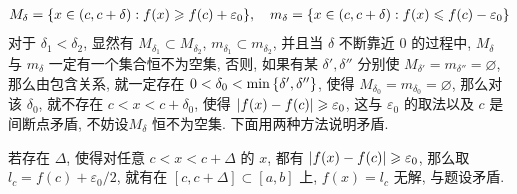 \begin{exercise}[series=exer]
\begin{answer}
        \begin{align*}
            M_{\delta} = \qty{x \in (c, c+\delta) : f(x) \geqslant f(c) + \varepsilon_{0}}, \quad m_{\delta} = \qty{x \in (c, c+\delta) : f(x) \leqslant f(c) - \varepsilon_{0}}
        \end{align*}
        对于 $ \delta_{1} < \delta_{2} $, 显然有 $ M_{\delta_{1}} \subset M_{\delta_{2}} $, $ m_{\delta_{1}} \subset m_{\delta_{2}} $, 并且当 $ \delta $ 不断靠近 $ 0 $ 的过程中, $ M_{\delta} $ 与 $ m_{\delta} $ 一定有一个集合恒不为空集, 否则, 如果有某 $ \delta', \delta'' $ 分别使 $ M_{\delta'} = m_{\delta''} = \varnothing $, 那么由包含关系, 就一定存在 $ 0 < \delta_{0} < \min\qty{\delta', \delta''} $, 使得 $ M_{\delta_{0}} = m_{\delta_{0}} = \varnothing $, 那么对该 $ \delta_{0} $, 就不存在 $ c < x < c + \delta_{0} $, 使得 $ \abs{f(x) - f(c)} \geqslant \varepsilon_{0} $, 这与 $ \varepsilon_{0} $ 的取法以及 $ c $ 是间断点矛盾, 不妨设$ M_{\delta} $ 恒不为空集. 下面用两种方法说明矛盾. 
        \begin{method}
            \item 若存在 $ \Delta $, 使得对任意 $ c < x < c + \Delta $ 的 $ x $, 都有 $ \abs{f(x) - f(c)} \geqslant \varepsilon_{0} $, 那么取 $ l_{c} = f(c) + \varepsilon_{0}/2 $, 就有在 $ [c, c + \Delta] \subset [a, b] $ 上, $ f(x) = l_{c} $ 无解, 与题设矛盾. 


\end{method}
\end{answer}
\end{exercise}
